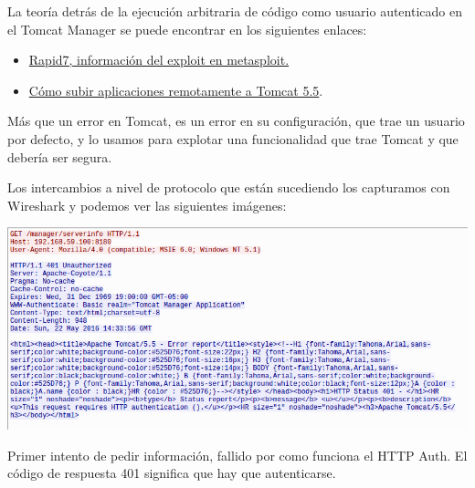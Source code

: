 \documentclass[a4paper,12pt]{scrartcl}
\begin{document}
La teoría detrás de la ejecución arbitraria de código como usuario autenticado en el Tomcat Manager se puede encontrar en los siguientes enlaces:

\begin{itemize}
	\item \hyperref{https://www.rapid7.com/db/modules/exploit/multi/http/tomcat_mgr_upload}{rapid7}{tomcat}{Rapid7, información del exploit en metasploit.}
	\item \hyperref{http://tomcat.apache.org/tomcat-5.5-doc/manager-howto.html#Deploy_A_New_Application_Remotely}{tomcat}{uploadwar}{Cómo subir aplicaciones remotamente a Tomcat 5.5}.
\end{itemize}

Más que un error en Tomcat, es un error en su configuración, que trae un usuario por defecto, y lo usamos para explotar una funcionalidad que trae Tomcat y que debería ser segura. 

\vspace{10pt}

Los intercambios a nivel de protocolo que están sucediendo los capturamos con Wireshark y podemos ver las siguientes imágenes:

\begin{center}
\includegraphics[width=1\linewidth]{cap1}

Primer intento de pedir información, fallido por como funciona el HTTP Auth. El código de respuesta 401 significa que hay que autenticarse.

\end{center}

\newpage
\end{document}
